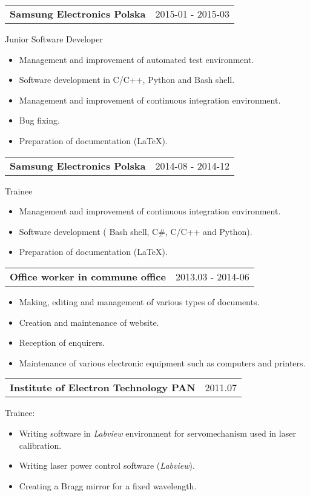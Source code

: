 \documentclass{article}
\begin{document}
\begin{tabular}{@{} m{} R{0.37\textwidth} }
\textbf{Samsung Electronics Polska}	& {2015-01 - 2015-03} 
\end{tabular}
Junior Software Developer\\
\begin{itemize}
	\item Management and improvement of automated test environment.
	\item Software development in C/C++, Python and Bash shell.
	\item Management and improvement of continuous integration environment.
	\item Bug fixing.
	\item Preparation of documentation (\LaTeX).
\end{itemize}
\begin{tabular}{@{} m{} R{0.37\textwidth} }
	{ \textbf{Samsung Electronics Polska}}	& {2014-08 - 2014-12} 
\end{tabular}
Trainee\\
\begin{itemize}
	\item Management and improvement of continuous integration environment.
	\item Software development ( Bash shell, C\#, C/C++ and Python).
	\item Preparation of documentation (\LaTeX). 
\end{itemize}
\begin{tabular}{@{} m{} R{0.37\textwidth} }
\textbf{Office worker in commune office}	& {2013.03 - 2014-06} 
\end{tabular}
\begin{itemize}
	\item Making, editing and management of various types of documents.
	\item Creation and maintenance of website.
	\item Reception of enquirers.
	\item Maintenance of various electronic equipment such as computers and printers.
\end{itemize}

\begin{tabular}{@{} m{} R{0.47\textwidth} }
\textbf{Institute of Electron Technology PAN}	& {2011.07} 
\end{tabular}
Trainee:
\begin{itemize}
	\item Writing software in \emph{Labview} environment for servomechanism used in laser calibration.
	\item Writing laser power control software (\emph{Labview}).
	\item Creating a Bragg mirror for a fixed wavelength.
\end{itemize}
\end{document}
